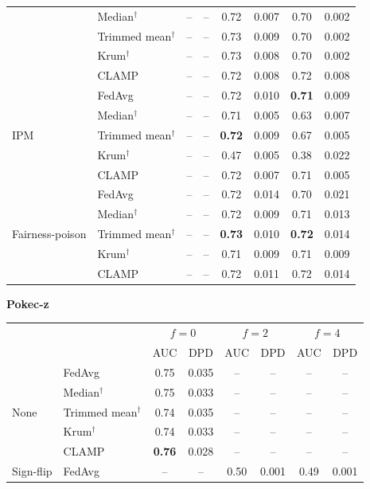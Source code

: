 \begin{table}[t]
\begin{tabular}{llcccccc}
 & Median$^\dagger$ & -- & -- & 0.72 & 0.007 & 0.70 & 0.002 \\
 & Trimmed mean$^\dagger$ & -- & -- & 0.73 & 0.009 & 0.70 & 0.002 \\
 & Krum$^\dagger$ & -- & -- & 0.73 & 0.008 & 0.70 & 0.002 \\
 & CLAMP & -- & -- & 0.72 & 0.008 & 0.72 & 0.008 \\
\midrule
\multirow{5}{*}{IPM} & FedAvg & -- & -- & 0.72 & 0.010 & \textbf{0.71} & 0.009 \\
 & Median$^\dagger$ & -- & -- & 0.71 & 0.005 & 0.63 & 0.007 \\
 & Trimmed mean$^\dagger$ & -- & -- & \textbf{0.72} & 0.009 & 0.67 & 0.005 \\
 & Krum$^\dagger$ & -- & -- & 0.47 & 0.005 & 0.38 & 0.022 \\
 & CLAMP & -- & -- & 0.72 & 0.007 & 0.71 & 0.005 \\
\midrule
\multirow{5}{*}{Fairness-poison} & FedAvg & -- & -- & 0.72 & 0.014 & 0.70 & 0.021 \\
 & Median$^\dagger$ & -- & -- & 0.72 & 0.009 & 0.71 & 0.013 \\
 & Trimmed mean$^\dagger$ & -- & -- & \textbf{0.73} & 0.010 & \textbf{0.72} & 0.014 \\
 & Krum$^\dagger$ & -- & -- & 0.71 & 0.009 & 0.71 & 0.009 \\
 & CLAMP & -- & -- & 0.72 & 0.011 & 0.72 & 0.014 \\
\bottomrule
\end{tabular}
\vspace{6pt}
\textbf{Pokec-z}\\[2pt]
\begin{tabular}{llcccccc}
\toprule
 & & \multicolumn{2}{c}{$f=0$} & \multicolumn{2}{c}{$f=2$} & \multicolumn{2}{c}{$f=4$} \\
 & & AUC & DPD & AUC & DPD & AUC & DPD \\
\midrule
\multirow{5}{*}{None} & FedAvg & 0.75 & 0.035 & -- & -- & -- & -- \\
 & Median$^\dagger$ & 0.75 & 0.033 & -- & -- & -- & -- \\
 & Trimmed mean$^\dagger$ & 0.74 & 0.035 & -- & -- & -- & -- \\
 & Krum$^\dagger$ & 0.74 & 0.033 & -- & -- & -- & -- \\
 & CLAMP & \textbf{0.76} & 0.028 & -- & -- & -- & -- \\
\midrule
\multirow{5}{*}{Sign-flip} & FedAvg & -- & -- & 0.50 & 0.001 & 0.49 & 0.001 \\

\end{tabular}
\end{table}
